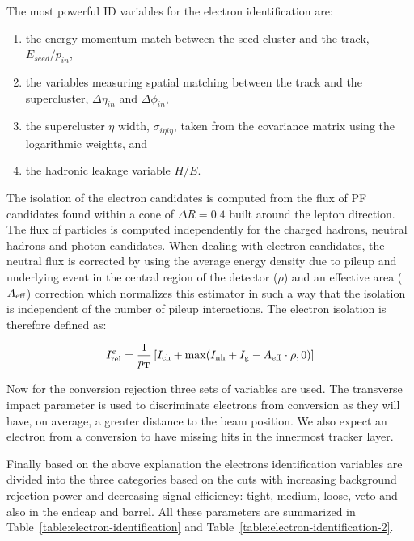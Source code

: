 The most powerful ID variables for the electron identification are:
\begin{enumerate}
  \item the energy-momentum match between the seed cluster and the track, $E_{seed}/p_{in}$,
  \item the variables measuring spatial matching between the track and the supercluster, $\Delta \eta_{in}$ and $\Delta \phi_{in}$,
  \item the supercluster $\eta$ width, $\sigma_{i\eta i\eta}$, taken from the covariance matrix using the logarithmic weights, and
  \item the hadronic leakage variable $H/E$.
\end{enumerate}

The isolation of the electron candidates is computed from the flux of PF candidates found within a cone of $\Delta R = 0.4$ built around the lepton direction.
The flux of particles is computed independently for the charged hadrons, neutral hadrons and photon candidates. When dealing with electron candidates, the neutral flux is corrected by using the average energy density due to
pileup and underlying event in the central region of the detector ($\rho$)
and an effective area ($A_{\rm eff}$) correction which normalizes this
estimator in such a way that the isolation is independent of the number of pileup interactions. The electron isolation is therefore defined as:

\begin{equation}
I^{e}_{\rm rel}=\frac{1}{p_{\rm T}}  \left[ I_{\rm ch}+\max(I_{\rm nh}+I_{\rm g}-A_{\rm eff}\cdot\rho,0) \right]
\label{eq:eleisol}
\end{equation}

Now for the conversion rejection three sets of variables are used. The transverse impact parameter is used to discriminate electrons from conversion as they will have, on average, a greater distance to the beam position. We also expect an electron from a conversion to have missing hits in the innermost tracker layer.

Finally based on the above explanation the electrons identification variables are divided into the three categories based on the cuts with increasing background rejection power and decreasing signal efficiency: tight, medium, loose, veto and also in the endcap and barrel. All these parameters are summarized in Table~\ref{table:electron-identification} and Table~\ref{table:electron-identification-2}.

